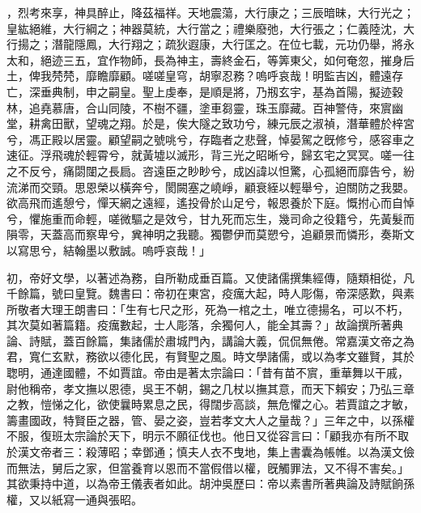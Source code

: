 \begin{pinyinscope}
，烈考來享，神具醉止，降茲福祥。天地震蕩，大行康之；三辰暗昧，大行光之；皇紘絕維，大行綱之；神器莫統，大行當之；禮樂廢弛，大行張之；仁義陸沈，大行揚之；潛龍隱鳳，大行翔之；疏狄遐康，大行匡之。在位七載，元功仍舉，將永太和，絕迹三五，宜作物師，長為神主，壽終金石，等筭東父，如何奄忽，摧身后土，俾我棾棾，靡瞻靡顧。嗟嗟皇穹，胡寧忍務？嗚呼哀哉！明監吉凶，體遠存亡，深垂典制，申之嗣皇。聖上虔奉，是順是將，乃剏玄宇，基為首陽，擬迹穀林，追堯慕唐，合山同陵，不樹不疆，塗車芻靈，珠玉靡藏。百神警侍，來賔幽堂，耕禽田獸，望魂之翔。於是，俟大隧之致功兮，練元辰之淑禎，潛華體於梓宮兮，馮正殿以居靈。顧望嗣之號咷兮，存臨者之悲聲，悼晏駕之旣修兮，感容車之速征。浮飛魂於輕霄兮，就黃墟以滅形，背三光之昭晰兮，歸玄宅之冥冥。嗟一往之不反兮，痛閟闥之長扃。咨遠臣之眇眇兮，成凶諱以怛驚，心孤絕而靡告兮，紛流涕而交頸。思恩榮以橫奔兮，閡闕塞之嶢崢，顧衰絰以輕舉兮，迫關防之我嬰。欲高飛而遙憩兮，憚天網之遠經，遙投骨於山足兮，報恩養於下庭。慨拊心而自悼兮，懼施重而命輕，嗟微驅之是效兮，甘九死而忘生，幾司命之役籍兮，先黃髮而隕零，天蓋高而察卑兮，兾神明之我聽。獨鬱伊而莫愬兮，追顧景而憐形，奏斯文以寫思兮，結翰墨以敷誠。嗚呼哀哉！」

初，帝好文學，以著述為務，自所勒成垂百篇。又使諸儒撰集經傳，隨類相從，凡千餘篇，號曰皇覽。魏書曰：帝初在東宮，疫癘大起，時人彫傷，帝深感歎，與素所敬者大理王朗書曰：「生有七尺之形，死為一棺之土，唯立德揚名，可以不朽，其次莫如著篇籍。疫癘數起，士人彫落，余獨何人，能全其壽？」故論撰所著典論、詩賦，蓋百餘篇，集諸儒於肅城門內，講論大義，侃侃無倦。常嘉漢文帝之為君，寬仁玄默，務欲以德化民，有賢聖之風。時文學諸儒，或以為孝文雖賢，其於聦明，通達國體，不如賈誼。帝由是著太宗論曰：「昔有苗不賔，重華舞以干戚，尉他稱帝，孝文撫以恩德，吳王不朝，錫之几杖以撫其意，而天下賴安；乃弘三章之教，愷悌之化，欲使曩時累息之民，得闊步高談，無危懼之心。若賈誼之才敏，籌畫國政，特賢臣之器，管、晏之姿，豈若孝文大人之量哉？」三年之中，以孫權不服，復班太宗論於天下，明示不願征伐也。他日又從容言曰：「顧我亦有所不取於漢文帝者三：殺薄昭；幸鄧通；慎夫人衣不曳地，集上書囊為帳帷。以為漢文儉而無法，舅后之家，但當養育以恩而不當假借以權，旣觸罪法，又不得不害矣。」其欲秉持中道，以為帝王儀表者如此。胡沖吳歷曰：帝以素書所著典論及詩賦餉孫權，又以紙寫一通與張昭。


\end{pinyinscope}

